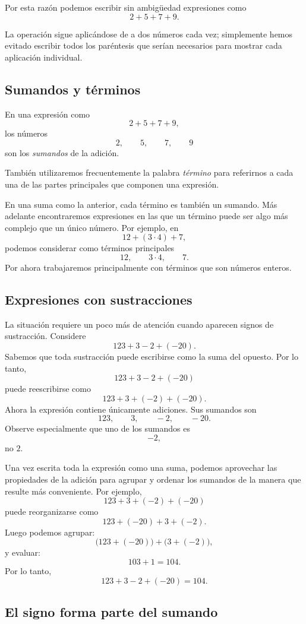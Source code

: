Por esta razón podemos escribir sin ambigüedad expresiones como
\[
2+5+7+9.
\]

La operación sigue aplicándose de a dos números cada vez; simplemente hemos evitado escribir todos los paréntesis que serían necesarios para mostrar cada aplicación individual.

\subsection{Sumandos y términos}

En una expresión como
\[
2+5+7+9,
\]
los números
\[
2,\qquad5,\qquad7,\qquad9
\]
son los \emph{sumandos} de la adición.

También utilizaremos frecuentemente la palabra \emph{término} para referirnos a cada una de las partes principales que componen una expresión.

En una suma como la anterior, cada término es también un sumando. Más adelante encontraremos expresiones en las que un término puede ser algo más complejo que un único número.
Por ejemplo, en
\[
12+(3\cdot 4)+7,
\]
podemos considerar como términos principales
\[
12,\qquad 3\cdot4,\qquad7.
\]
Por ahora trabajaremos principalmente con términos que son números enteros.

\subsection{Expresiones con sustracciones}

La situación requiere un poco más de atención cuando aparecen signos de sustracción.
Considere
\[
123+3-2+(-20).
\]
Sabemos que toda sustracción puede escribirse como la suma del opuesto. Por lo tanto,
\[
123+3-2+(-20)
\]
puede reescribirse como
\[
123+3+(-2)+(-20).
\]
Ahora la expresión contiene únicamente adiciones.
Sus sumandos son
\[
123,\qquad3,\qquad-2,\qquad-20.
\]
Observe especialmente que uno de los sumandos es
\[
-2,
\]
no \(2\).

Una vez escrita toda la expresión como una suma, podemos aprovechar las propiedades de la adición para agrupar y ordenar los sumandos de la manera que resulte más conveniente.
Por ejemplo,
\[
123+3+(-2)+(-20)
\]
puede reorganizarse como
\[
123+(-20)+3+(-2).
\]
Luego podemos agrupar:
\[
\bigl(123+(-20)\bigr)+\bigl(3+(-2)\bigr),
\]
y evaluar:
\[
103+1=104.
\]
Por lo tanto,
\[
123+3-2+(-20)=104.
\]

\subsection{El signo forma parte del sumando}

